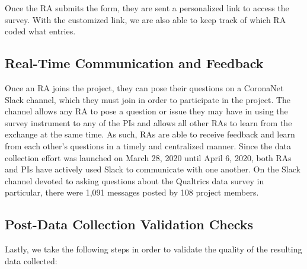 \documentclass[]{article}
\begin{document}
Once the RA submits the form, they are sent a personalized link to access the survey. With the customized link, we are also able to keep track of which RA coded what entries.

\hypertarget{real-time-communication-and-feedback}{%
\subsection{Real-Time Communication and Feedback}\label{real-time-communication-and-feedback}}

Once an RA joins the project, they can pose their questions on a CoronaNet Slack channel, which they must join in order to participate in the project. The channel allows any RA to pose a question or issue they may have in using the survey instrument to any of the PIs and allows all other RAs to learn from the exchange at the same time. As such, RAs are able to receive feedback and learn from each other's questions in a timely and centralized manner. Since the data collection effort was launched on March 28, 2020 until April 6, 2020, both RAs and PIs have actively used Slack to communicate with one another. On the Slack channel devoted to asking questions about the Qualtrics data survey in particular, there were 1,091 messages posted by 108 project members.

\hypertarget{post-data-collection-validation-checks}{%
\subsection{Post-Data Collection Validation Checks}\label{post-data-collection-validation-checks}}

Lastly, we take the following steps in order to validate the quality of the resulting data collected:
\end{document}
